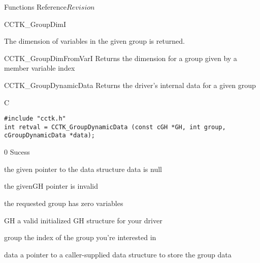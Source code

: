 \begin{cactuspart}{ Functions Reference}{}{$Revision$}
\begin{FunctionDescription}{CCTK\_GroupDimI}
\begin{Discussion}
The dimension of variables in the given group is returned.
\end{Discussion}

\begin{SeeAlsoSection}
\begin{SeeAlso}{CCTK\_GroupDimFromVarI}
Returns the dimension for a group given by a member variable index
\end{SeeAlso}
\end{SeeAlsoSection}
\end{FunctionDescription}


\begin{FunctionDescription}{CCTK\_GroupDynamicData}{}
\label{CCTK-GroupDynamicData}
Returns the driver's internal data for a given group
\begin{SynopsisSection}
\begin{Synopsis}{C}
\begin{verbatim}
#include "cctk.h"
int retval = CCTK_GroupDynamicData (const cGH *GH, int group, cGroupDynamicData *data);
\end{verbatim}
\end{Synopsis}
\end{SynopsisSection}

\begin{ResultSection}
\begin {Result}{0}
Sucess
\end{Result}
\begin{Result}{-1}
the given pointer to the data structure data is null
\end{Result}
\begin{Result}{-3}
the givenGH pointer is invalid
\end{Result}
\begin{Result}{-77}
the requested group has zero variables
\end{Result}
\end{ResultSection}

\begin{ParameterSection}
\begin{Parameter}{GH}
a valid initialized GH structure for your driver
\end{Parameter}
\begin{Parameter}{group}
the index of the group you're interested in
\end{Parameter}
\begin{Parameter}{data}
a pointer to a caller-supplied data structure to store the group data
\end{Parameter}
\end{ParameterSection}


\end{FunctionDescription}
\end{cactuspart}

